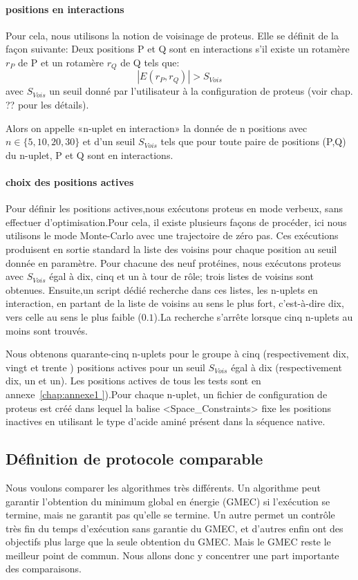 \paragraph{positions en interactions}
Pour cela, nous utilisons la notion de voisinage de proteus. Elle se définit de la façon suivante:  
Deux positions P et Q sont en interactions s'il existe un rotamère $r_P$ de P et un rotamère $r_Q$ de Q tels que:
\begin{displaymath}
 | E(r_P,r_Q) | > S_{Vois}
\end{displaymath} 
avec $S_{Vois}$ un seuil donné par l'utilisateur à la configuration de proteus (voir chap. ?? pour les détails).

Alors on appelle «n-uplet en interaction» la donnée de n positions avec $n \in \{5,10,20,30\}$ et d'un seuil  $S_{Vois}$  tels que pour toute paire de positions (P,Q) du n-uplet, P et Q sont en interactions.
\paragraph{choix des  positions actives}
Pour définir les positions actives,nous exécutons proteus en mode verbeux, sans effectuer d'optimisation.Pour cela,
il existe plusieurs façons de procéder, ici nous utilisons le mode Monte-Carlo avec une trajectoire de zéro pas. Ces exécutions produisent en sortie standard la liste des voisins pour chaque position au seuil donnée en paramètre.
Pour chacune des neuf protéines, nous exécutons proteus avec $S_{Vois}$ égal à dix, cinq et un à tour de rôle; trois listes de voisins sont obtenues. 
Ensuite,un script dédié recherche dans ces listes, les n-uplets en interaction, en partant de la liste de voisins au sens le plus fort, c'est-à-dire dix, vers celle  au sens le plus faible ($0.1$).La recherche s'arrête lorsque cinq n-uplets au moins sont trouvés.

Nous obtenons quarante-cinq n-uplets pour le groupe à cinq (respectivement dix, vingt et trente ) positions actives pour un seuil $S_{Vois}$ égal à dix (respectivement dix, un et un). Les positions actives de tous les tests sont en annexe~\ref{chap:annexe1 }).Pour chaque n-uplet, un fichier de configuration de proteus est créé dans lequel la balise <Space\_Constraints> fixe les positions inactives en utilisant le type d'acide aminé présent dans la séquence native. 


\subsection{Définition de protocole comparable}
\label{sec:proto_compa}
Nous voulons comparer les algorithmes très différents. Un algorithme peut garantir l'obtention du minimum global en énergie (GMEC) si l'exécution se termine, mais ne garantit pas qu'elle se termine. Un autre permet un contrôle très fin du temps d'exécution sans garantie du GMEC, et d'autres enfin ont des objectifs plus large que la seule obtention du GMEC.
Mais le GMEC reste le meilleur point de commun. Nous allons donc y concentrer une part importante des comparaisons.

